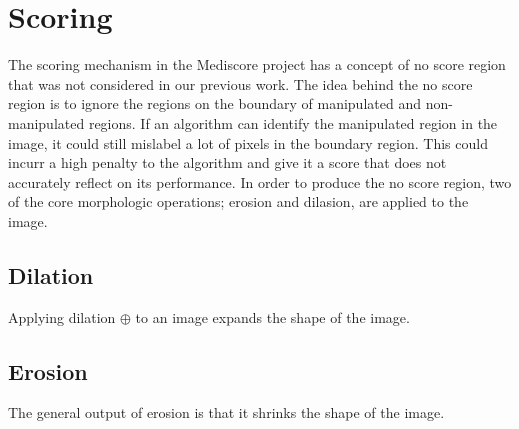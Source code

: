 
\section{Scoring}

The scoring mechanism in the Mediscore project has a concept of no score region that was not considered in our previous work. The idea behind the no score region is to 
ignore the regions on the boundary of manipulated and non-manipulated regions. If an algorithm can identify the manipulated region in the image, it could still mislabel 
a lot of pixels in the boundary region. This could incurr a high penalty to the algorithm and give it a score that does not accurately reflect on its performance. In
order to produce the no score region, two of the core morphologic operations; erosion and dilasion, are applied to the image.

\subsection{Dilation}

Applying dilation $\oplus$ to an image expands the shape of the image. 

\subsection{Erosion}

The general output of erosion is that it shrinks the shape of the image. 

\cite{tambe2013image}